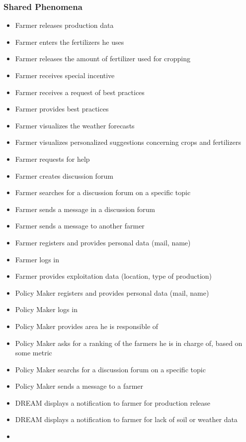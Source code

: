 \subsubsection{Shared Phenomena}
\begin{itemize}
	
	\item
	Farmer releases production data
	\item
	Farmer enters the fertilizers he uses
	\item
	Farmer releases the amount of fertilizer used for cropping
	\item
	Farmer receives special incentive
	\item
	Farmer receives a request of best practices
	\item
	Farmer provides best practices
	\item
	Farmer visualizes the weather forecasts
	\item
	Farmer visualizes personalized suggestions concerning crops and fertilizers
	\item
	Farmer requests for help
	\item
	Farmer creates discussion forum
	\item
	Farmer searches for a discussion forum on a specific topic
	\item
	Farmer sends a message in a discussion forum
	\item
	Farmer sends a message to another farmer
	\item
	Farmer registers and provides personal data (mail, name)
	\item
	Farmer logs in
	\item
	Farmer provides exploitation data (location, type of production)
	\item
	Policy Maker registers and provides personal data (mail, name)
	\item
	Policy Maker logs in
	\item
	Policy Maker provides area he is responsible of
	\item
	Policy Maker asks for a ranking of the farmers he is in charge of, based on some metric
	\item
	Policy Maker searchs for a discussion forum on a specific topic
	\item
	Policy Maker sends a message to a farmer
	\item
	DREAM displays a notification to farmer for production release
	\item
	DREAM displays a notification to farmer for lack of soil or weather data
	\item

\end{itemize}
